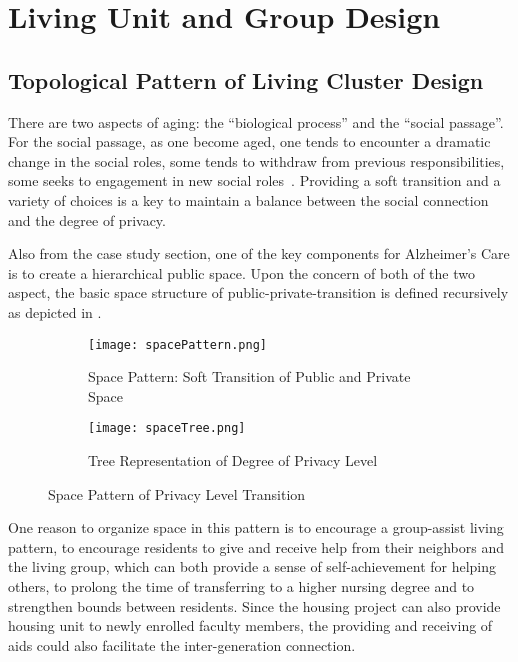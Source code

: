 \clearpage
\section{Living Unit and Group Design}
\subsection{Topological Pattern of Living Cluster Design}
There are two aspects of aging: the ``biological process'' and the
``social passage''. For the social passage, as one become aged, one
tends to encounter a dramatic change in the social roles, some tends
to withdraw from previous responsibilities, some seeks to engagement
in new social roles~\cite{Perkins2004}. Providing a soft transition
and a variety of choices is a key to maintain a balance between the
social connection and the degree of privacy. 

Also from the case study section, one of the key components for
Alzheimer's Care is to create a hierarchical public space. Upon the
concern of both of the two aspect, the basic space structure of
public-private-transition is defined recursively as depicted in
.~
\begin{figure}[h!]
\centering
\begin{subfigure}{0.7\textwidth}
  \centering
  \texttt{[image: spacePattern.png]}
  \caption{Space Pattern: Soft Transition of Public and Private Space}
  \label{fig:spacePattern}
\end{subfigure}
\begin{subfigure}{0.7\textwidth}
  \centering
  \texttt{[image: spaceTree.png]}
  \caption{Tree Representation of Degree of Privacy Level}
  \label{fig:spaceTree}
\end{subfigure}
\caption{Space Pattern of Privacy Level Transition}
\label{fig:spacePrivacy}
\end{figure}

One reason to organize space in this pattern is to encourage a
group-assist living pattern, to encourage residents to give and
receive help from their neighbors and the living group, which can both
provide a sense of self-achievement for helping others, to prolong the
time of transferring to a higher nursing degree and to strengthen
bounds between residents. Since the housing project can also provide
housing unit to newly enrolled faculty members, the providing and
receiving of aids could also facilitate the inter-generation
connection.

